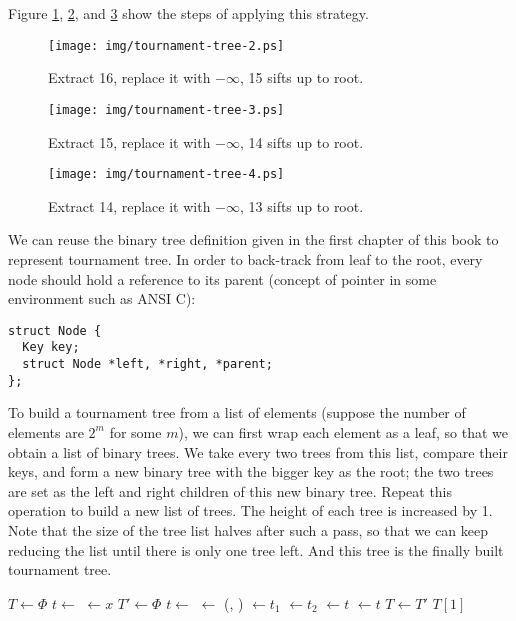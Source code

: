 \documentclass{article}
\begin{document}
Figure \ref{fig:tournament-tree-2}, \ref{fig:tournament-tree-3}, and \ref{fig:tournament-tree-4}
show the steps of applying this strategy.

\begin{figure}[htbp]
  \centering
  \texttt{[image: img/tournament-tree-2.ps]}
  \caption{Extract 16, replace it with $-\infty$, 15 sifts up to root.}
  \label{fig:tournament-tree-2}
\end{figure}

\begin{figure}[htbp]
  \centering
  \texttt{[image: img/tournament-tree-3.ps]}
  \caption{Extract 15, replace it with $-\infty$, 14 sifts up to root.}
  \label{fig:tournament-tree-3}
\end{figure}

\begin{figure}[htbp]
  \centering
  \texttt{[image: img/tournament-tree-4.ps]}
  \caption{Extract 14, replace it with $-\infty$, 13 sifts up to root.}
  \label{fig:tournament-tree-4}
\end{figure}

We can reuse the binary tree definition given in the first chapter of this book to represent
tournament tree. In order to back-track from leaf to the root, every node should hold a reference
to its parent (concept of pointer in some environment such as ANSI C):

\lstset{language=C}
\begin{lstlisting}
struct Node {
  Key key;
  struct Node *left, *right, *parent;
};
\end{lstlisting}

To build a tournament tree from a list of elements (suppose the number of elements are $2^m$ for some $m$),
we can first wrap each element as a leaf, so that we obtain a list of binary trees. We take every two
trees from this list, compare their keys, and form a new binary tree with the bigger key as the root;
the two trees are set as the left and right children of this new binary tree. Repeat this operation
to build a new list of trees. The height of each tree is increased by 1. Note that the size of the tree
list halves after such a pass, so that we can keep reducing the list until there is only one tree left.
And this tree is the finally built tournament tree.

\begin{algorithmic}
  \State $T \gets \Phi$
    \State $t \gets $ 
    \State {} $\gets x$
    \State {}
  \EndFor
    \State $T' \gets \Phi$
      \State $t \gets $ 
      \State {} $\gets$ (, )
      \State {} $\gets t_1$
      \State {} $\gets t_2$
      \State {} $\gets t$
      \State {} $\gets t$
      \State {}
    \EndFor
    \State $T \gets T'$
  \EndWhile
  \State \Return $T[1]$
\EndFunction
\end{algorithmic}
\end{document}
